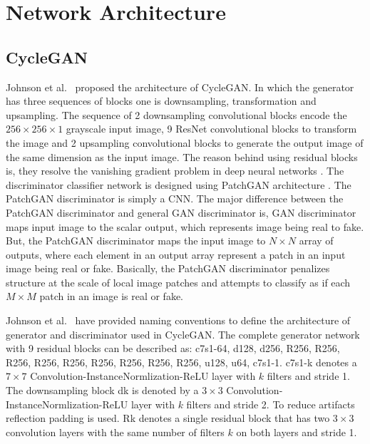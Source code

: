 \newpage

\section{Network Architecture}\label{NetworkArchitecture}

\subsection{\ac{CycleGAN}}

Johnson et al.\ \cite{johnson2016perceptual} proposed the architecture of \ac{CycleGAN}. In which the generator has three sequences of blocks one is downsampling, transformation and upsampling. The sequence of 2 downsampling convolutional blocks encode the $256 \times 256 \times 1$ grayscale input image, 9 \ac{ResNet} convolutional blocks to transform the image and 2 upsampling convolutional blocks to generate the output image of the same dimension as the input image. The reason behind using residual blocks is, they resolve the vanishing gradient problem in deep neural networks \cite{he2015deep}. The discriminator classifier network is designed using PatchGAN architecture \cite{isola2018imagetoimage} \cite{li2016precomputed}. The PatchGAN discriminator is simply a \ac{CNN}. The major difference between the PatchGAN discriminator and general \ac{GAN} discriminator is, \ac{GAN} discriminator maps input image to the scalar output, which represents image being real to fake. But, the PatchGAN discriminator maps the input image to $N \times N$ array of outputs, where each element in an output array represent a patch in an input image being real or fake. Basically, the PatchGAN discriminator penalizes structure at the scale of local image patches and attempts to classify as if each $M \times M$ patch in an image is real or fake.


Johnson et al.\ \cite{johnson2016perceptual} have provided naming conventions to define the architecture of generator and discriminator used in \ac{CycleGAN}. The complete generator network with 9 residual blocks can be described as: {\selectfont c7s1-64, d128, d256, R256, R256, R256, R256, R256, R256, R256, R256, R256, u128, u64, c7s1-1}. {\selectfont c7s1-k} denotes a $7 \times 7$ Convolution-InstanceNormlization-ReLU layer with $k$ filters and stride 1. The downsampling block {\selectfont dk} is denoted by a $3 \times 3$ Convolution-InstanceNormlization-ReLU layer with $k$ filters and stride 2. To reduce artifacts reflection padding is used. {\selectfont Rk} denotes a single residual block that has two $3 \times 3$ convolution layers with the same number of filters $k$ on both layers and stride 1. 

